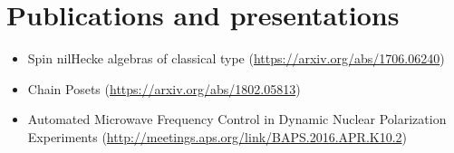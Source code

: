 \documentclass[10pt]{article}
\begin{document}
\section*{Publications and presentations}
\begin{itemize}
\item Spin nilHecke algebras of classical type
  (\url{https://arxiv.org/abs/1706.06240})
\item Chain Posets (\url{https://arxiv.org/abs/1802.05813})
\item Automated Microwave Frequency Control in Dynamic Nuclear Polarization
  Experiments (\url{http://meetings.aps.org/link/BAPS.2016.APR.K10.2})
\end{itemize}
\end{document}
